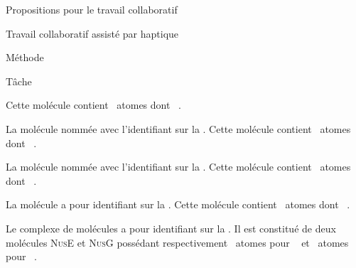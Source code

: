 \documentclass[myfrancais]{mythesis}
\begin{document}
\begin{mypart}{Propositions pour le travail collaboratif}
\begin{mychapter}{Travail collaboratif assisté par haptique}
\begin{mysection}{Méthode}
\begin{mysubsection}{Tâche}
\begin{description}
							Cette molécule contient ~atomes dont ~.
						\item[\myPrion]
							La molécule nommée \myPrion {} avec l'identifiant \myPDB {} sur la \myPDBbase\footnotemark[\value{footnote}].
							Cette molécule contient ~atomes dont ~.
						\item[\myUbiquitin]
							La molécule nommée \myUbiquitin {} avec l'identifiant \myPDB {} sur la \myPDBbase\footnotemark[\value{footnote}].
							Cette molécule contient ~atomes dont ~.
						\item[\myTRPZIPPER]
							La molécule \myTRPZIPPER {} a pour identifiant \myPDB {} sur la \myPDBbase\footnotemark[\value{footnote}].
							Cette molécule contient ~atomes dont ~.
						\item[\myNusENusG]
							Le complexe de molécules \myNusENusG {} a pour identifiant \myPDB {} sur la \myPDBbase\footnotemark[\value{footnote}].
							Il est constitué de deux molécules \textsc{NusE} et \textsc{NusG} possédant respectivement ~atomes pour ~ et ~atomes pour ~.
					\end{description}


\end{mysubsection}
\end{mysection}
\end{mychapter}
\end{mypart}
\end{document}
